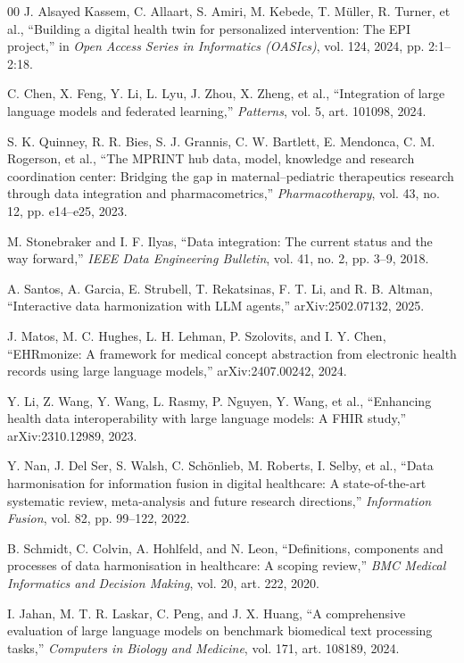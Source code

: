 \documentclass[conference]{IEEEtran}
\begin{document}
\begin{thebibliography}{00}
 J. Alsayed Kassem, C. Allaart, S. Amiri, M. Kebede, T. M\"uller, R. Turner, et al., ``Building a digital health twin for personalized intervention: The EPI project,'' in \emph{Open Access Series in Informatics (OASIcs)}, vol. 124, 2024, pp. 2:1--2:18.

 C. Chen, X. Feng, Y. Li, L. Lyu, J. Zhou, X. Zheng, et al., ``Integration of large language models and federated learning,'' \emph{Patterns}, vol. 5, art. 101098, 2024.

 S. K. Quinney, R. R. Bies, S. J. Grannis, C. W. Bartlett, E. Mendonca, C. M. Rogerson, et al., ``The MPRINT hub data, model, knowledge and research coordination center: Bridging the gap in maternal--pediatric therapeutics research through data integration and pharmacometrics,'' \emph{Pharmacotherapy}, vol. 43, no. 12, pp. e14--e25, 2023.

 M. Stonebraker and I. F. Ilyas, ``Data integration: The current status and the way forward,'' \emph{IEEE Data Engineering Bulletin}, vol. 41, no. 2, pp. 3--9, 2018.

 A. Santos, A. Garcia, E. Strubell, T. Rekatsinas, F. T. Li, and R. B. Altman, ``Interactive data harmonization with LLM agents,'' arXiv:2502.07132, 2025.

 J. Matos, M. C. Hughes, L. H. Lehman, P. Szolovits, and I. Y. Chen, ``EHRmonize: A framework for medical concept abstraction from electronic health records using large language models,'' arXiv:2407.00242, 2024.

 Y. Li, Z. Wang, Y. Wang, L. Rasmy, P. Nguyen, Y. Wang, et al., ``Enhancing health data interoperability with large language models: A FHIR study,'' arXiv:2310.12989, 2023.

 Y. Nan, J. Del Ser, S. Walsh, C. Sch\"onlieb, M. Roberts, I. Selby, et al., ``Data harmonisation for information fusion in digital healthcare: A state-of-the-art systematic review, meta-analysis and future research directions,'' \emph{Information Fusion}, vol. 82, pp. 99--122, 2022.

 B. Schmidt, C. Colvin, A. Hohlfeld, and N. Leon, ``Definitions, components and processes of data harmonisation in healthcare: A scoping review,'' \emph{BMC Medical Informatics and Decision Making}, vol. 20, art. 222, 2020.

 I. Jahan, M. T. R. Laskar, C. Peng, and J. X. Huang, ``A comprehensive evaluation of large language models on benchmark biomedical text processing tasks,'' \emph{Computers in Biology and Medicine}, vol. 171, art. 108189, 2024.


\end{thebibliography}
\end{document}

